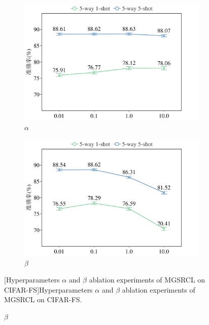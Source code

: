 \begin{figure}[h!]
\centering
{}
\begin{subfigure}{0.495\columnwidth}
\includegraphics[width=\columnwidth]{figures/MGSRCL/CIFAR-FS/alpha.pdf}
\caption{$\alpha$}
\label{figure3: alpha(CIFAR-FS)}
\end{subfigure}
\begin{subfigure}{0.495\columnwidth}
\includegraphics[width=\columnwidth]{figures/MGSRCL/CIFAR-FS/beta.pdf}
\caption{$\beta$}
\label{figure3: beta(CIFAR-FS)}
\end{subfigure}
[Hyperparameters $\alpha$ and $\beta$ ablation experiments of MGSRCL on CIFAR-FS]{Hyperparameters $\alpha$ and $\beta$ ablation experiments of MGSRCL on CIFAR-FS.}
\label{figure3: alpha and beta (CIFAR-FS)}
\end{figure}


